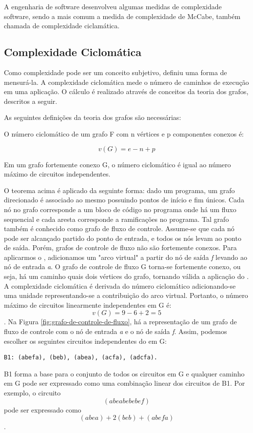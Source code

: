 A engenharia de software desenvolveu algumas medidas de complexidade software, sendo a mais comum a medida de complexidade de McCabe, também chamada de complexidade ciclamática. 

\subsection{ Complexidade Ciclomática }

Como complexidade pode ser um conceito subjetivo, \cite{mccabe1976complexity} definiu uma forma de mensurá-la. A complexidade ciclomática mede o número de caminhos de execução em uma aplicação. O cálculo é realizado através de conceitos da teoria dos grafos, descritos a seguir.

As seguintes definições da teoria dos grafos são necessárias:
\begin{definition}
O número ciclomático de um grafo F com n vértices e p componentes conexos é:
\end{definition}
\[ v(G) = e - n + p \]
\begin{theorem}
Em um grafo fortemente conexo G, o número ciclomático é igual ao número máximo de circuitos independentes. 
\end{theorem}

O teorema acima é aplicado da seguinte forma: dado um programa, um grafo direcionado é associado ao mesmo possuindo pontos de início e fim únicos. Cada nó no grafo corresponde a um bloco de código no programa onde há um fluxo sequencial e cada aresta corresponde a ramificações no programa. Tal grafo também é conhecido como grafo de fluxo de controle. Assume-se que cada nó pode ser alcançado partido do ponto de entrada, e todos os nós levam ao ponto de saída. Porém, grafos de controle de fluxo não são fortemente conexos. Para aplicarmos o , adicionamos um "arco virtual" a partir do nó de saída \textit{f} levando ao nó de entrada \textit{a}. O grafo de controle de fluxo G torna-se fortemente conexo, ou seja, há um caminho quais dois vértices do grafo, tornando válida a aplicação do . A complexidade ciclomática é derivada do número ciclomático adicionando-se uma unidade representando-se a contribuição do arco virtual\cite{watson1996structured}. Portanto, o número máximo de circuitos linearmente independentes em G é:
\[v(G) = 9 - 6 + 2 = 5\].
Na Figura \ref{fig:grafo-de-controle-de-fluxo}, há a representação de um grafo de fluxo de controle com o nó de entrada \textit{a} e o nó de saída \textit{f}. 
Assim, podemos escolher os seguintes circuitos independentes do em G:
\begin{verbatim}
B1: (abefa), (beb), (abea), (acfa), (adcfa).
\end{verbatim}
B1 forma a base para o conjunto de todos os circuitos em G e qualquer caminho em G pode ser expressado como uma combinação linear dos circuitos de B1. Por exemplo, o circuito \[(abeabebebef)\] pode ser expressado como \[(abea)+2(beb)+(abefa)\]. 

